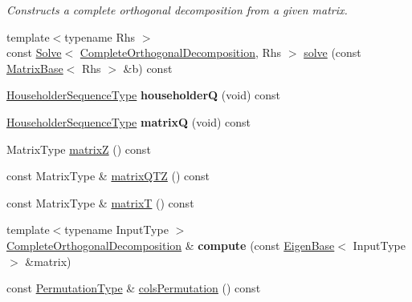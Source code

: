 \begin{DoxyCompactItemize}
\begin{DoxyCompactList}\small\item\em Constructs a complete orthogonal decomposition from a given matrix. \end{DoxyCompactList}\item 
{\footnotesize template$<$typename Rhs $>$ }\\const \hyperlink{group___core___module_class_eigen_1_1_solve}{Solve}$<$ \hyperlink{group___q_r___module_class_eigen_1_1_complete_orthogonal_decomposition}{Complete\+Orthogonal\+Decomposition}, Rhs $>$ \hyperlink{group___q_r___module_ab303e177cc7df17e435c79dca9ef5654}{solve} (const \hyperlink{group___core___module_class_eigen_1_1_matrix_base}{Matrix\+Base}$<$ Rhs $>$ \&b) const
\item 
\mbox{\label{group___q_r___module_a0b3d61053f9fc2ef5e3abd3f39919f2c}} 
\hyperlink{group___householder___module_class_eigen_1_1_householder_sequence}{Householder\+Sequence\+Type} {\bfseries householderQ} (void) const
\item 
\mbox{\label{group___q_r___module_a179e996df71ef165bad8f4bc5d79e24d}} 
\hyperlink{group___householder___module_class_eigen_1_1_householder_sequence}{Householder\+Sequence\+Type} {\bfseries matrixQ} (void) const
\item 
Matrix\+Type \hyperlink{group___q_r___module_a4cd178f13aefe5189d4beeb3eb1c5897}{matrixZ} () const
\item 
const Matrix\+Type \& \hyperlink{group___q_r___module_ad89e2529fc1a8721239d9b6be9613a69}{matrix\+Q\+TZ} () const
\item 
const Matrix\+Type \& \hyperlink{group___q_r___module_a806213f5c96ff765265f47067229586d}{matrixT} () const
\item 
\mbox{\label{group___q_r___module_a28aa1e99ac0116246c66608f3fd10d31}} 
{\footnotesize template$<$typename Input\+Type $>$ }\\\hyperlink{group___q_r___module_class_eigen_1_1_complete_orthogonal_decomposition}{Complete\+Orthogonal\+Decomposition} \& {\bfseries compute} (const \hyperlink{group___core___module_struct_eigen_1_1_eigen_base}{Eigen\+Base}$<$ Input\+Type $>$ \&matrix)
\item 
const \hyperlink{group___core___module}{Permutation\+Type} \& \hyperlink{group___q_r___module_a601c67a4a0bbe9c7b25b885279db9ff2}{cols\+Permutation} () const

\end{DoxyCompactItemize}
